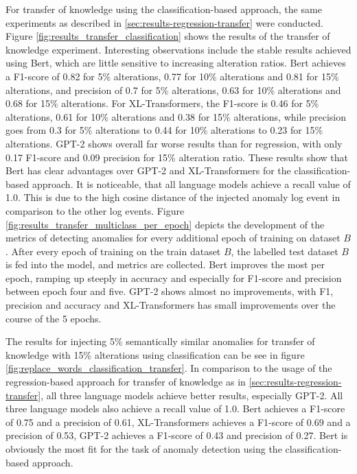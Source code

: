 For transfer of knowledge using the classification-based approach, the same experiments as described in \ref{sec:results-regression-transfer} were conducted. Figure \ref{fig:results_transfer_classification} shows the results of the transfer of knowledge experiment. Interesting observations include the stable results achieved using Bert, which are little sensitive to increasing alteration ratios. Bert achieves a F1-score of 0.82 for 5\% alterations, 0.77 for 10\% alterations and 0.81 for 15\% alterations, and precision of 0.7 for 5\% alterations, 0.63 for 10\% alterations and 0.68 for 15\% alterations. For XL-Transformers, the F1-score is 0.46 for 5\% alterations, 0.61 for 10\% alterations and 0.38 for 15\% alterations, while precision goes from 0.3 for 5\% alterations to 0.44 for 10\% alterations to 0.23 for 15\% alterations. GPT-2 shows overall far worse results than for regression, with only 0.17 F1-score and 0.09 precision for 15\% alteration ratio.
These results show that Bert has clear advantages over GPT-2 and XL-Transformers for the classification-based approach. It is noticeable, that all language models achieve a recall value of 1.0. This is due to the high cosine distance of the injected anomaly log event in comparison to the other log events.
Figure \ref{fig:results_transfer_multiclass_per_epoch} depicts the development of the metrics of detecting anomalies for every additional epoch of training on dataset $B$. After every epoch of training on the train dataset $B$, the labelled test dataset $B$ is fed into the model, and metrics are collected. Bert improves the most per epoch, ramping up steeply in accuracy and especially for F1-score and precision between epoch four and five. GPT-2 shows almost no improvements, with F1, precision and accuracy and XL-Transformers has small improvements over the course of the 5 epochs. 



The results for injecting 5\% semantically similar anomalies for transfer of knowledge with 15\% alterations using classification can be see in figure \ref{fig:replace_words_classification_transfer}. In comparison to the usage of the regression-based approach for transfer of knowledge as in \ref{sec:results-regression-transfer}, all three language models achieve better results, especially GPT-2. All three language models also achieve a recall value of 1.0. Bert achieves a F1-score of 0.75 and a precision of 0.61, XL-Transformers achieves a F1-score of 0.69 and a precision of 0.53, GPT-2 achieves a F1-score of 0.43 and precision of 0.27. Bert is obviously the most fit for the task of anomaly detection using the classification-based approach.

